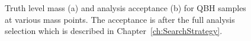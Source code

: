 \begin{figure}[]
	\centering
	\hspace{0.05\columnwidth}%
	\caption{Truth level mass (a) and analysis acceptance (b) for QBH samples at various mass points.  The acceptance is after the full analysis selection which is described in Chapter~\ref{ch:SearchStrategy}. 
	}
	\label{fig:QBHPeaks}
\end{figure}
